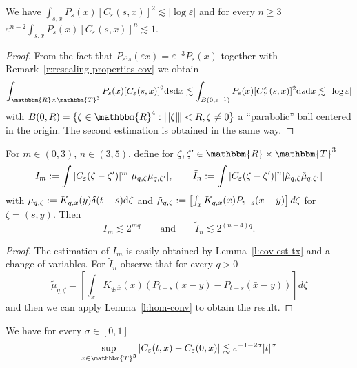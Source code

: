 \begin{appendices}
\begin{lemma}
  \label{l:PC-integrals}We have $\int_{s, x} P_s (x) [C_{\varepsilon} (s,
  x)]^2 \lesssim | \log \varepsilon |$ and for every $n \geqslant 3$
  $\varepsilon^{n - 2} \int_{s, x} P_s (x) [C_{\varepsilon} (s, x)]^n \lesssim
  1$.
\end{lemma}

\begin{proof}
  From the fact that $P_{\varepsilon^2 s} (\varepsilon x) = \varepsilon^{- 3}
  P_s (x)$ together with Remark~\ref{r:rescaling-properties-cov} we obtain
  \[ \int_{\mathbbm{R} \times \mathbbm{T}^3} P_s (x) [C_{\varepsilon} (s,
     x)]^2 \mathd s \mathd x \lesssim \int_{B (0, \varepsilon^{- 1})} P_s (x)
     [C_Y^{\varepsilon} (s, x)]^2 \mathd s \mathd x \lesssim | \log
     \varepsilon | \]
  with $B (0, R) = \{\zeta \in \mathbbm{R}^4 : \interleave \zeta \interleave <
  R, \zeta \neq 0\}$ a ``parabolic'' ball centered in the origin. The second
  estimation is obtained in the same way.
\end{proof}

\begin{lemma}
  \label{l:integral-firstorder-est} For $m \in (0, 3)$, $n \in (3, 5)$, define
  for $\zeta, \zeta' \in \mathbbm{R} \times \mathbbm{T}^3$
  \[ I_m := \int | C_{\varepsilon} (\zeta - \zeta') |^m  | \mu_{q, \zeta}
     \mu_{q, \zeta'} |, \qquad \tilde{I}_n := \int | C_{\varepsilon}
     (\zeta - \zeta') |^n  | \tilde{\mu}_{q, \zeta}  \tilde{\mu}_{q, \zeta'} |
  \]
  with $\mu_{q, \zeta} := K_{q, \bar{x}} (y) \delta (t - s) \mathrm{d} \zeta$
  and $\tilde{\mu}_{q, \zeta} := \left[ \int_x K_{q, \bar{x}} (x) P_{t -
  s} (x - y) \right] d \zeta$ for $\zeta = (s, y)$. Then
  \[ I_m \lesssim 2^{mq} \qquad \text{and} \qquad \tilde{I}_n \lesssim 2^{(n -
     4) q} . \]
\end{lemma}

\begin{proof}
  The estimation of $I_m$ is easily obtained by Lemma~\ref{l:cov-est-tx} and a
  change of variables. For $\tilde{I}_n$ observe that for every $q > 0$
  \[ \tilde{\mu}_{q, \zeta} = [\int_x K_{q, \bar{x}} (x) (P_{t - s} (x - y) -
     P_{t - s} (\bar{x} - y))] d \zeta \]
  and then we can apply Lemma~\ref{l:hom-conv} to obtain the result.
\end{proof}

\begin{lemma}
  \label{l:covar-difference}We have for every $\sigma \in [0, 1]$
  \[ \sup_{x \in \mathbbm{T}^3} | C_{\varepsilon} (t, x) - C_{\varepsilon} (0,
     x) | \lesssim \varepsilon^{- 1 - 2 \sigma} | t |^{\sigma} \]
\end{lemma}


\end{appendices}

